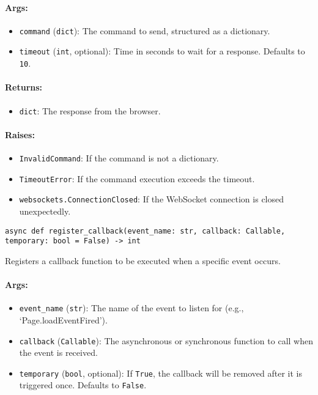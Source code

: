 \documentclass{article}
\begin{document}
\paragraph{Args:}
\begin{itemize}
    \item \texttt{command} (\texttt{dict}): The command to send, structured as a dictionary.
    \item \texttt{timeout} (\texttt{int}, optional): Time in seconds to wait for a response. Defaults to \texttt{10}.
\end{itemize}

\paragraph{Returns:}
\begin{itemize}
    \item \texttt{dict}: The response from the browser.
\end{itemize}

\paragraph{Raises:}
\begin{itemize}
    \item \texttt{InvalidCommand}: If the command is not a dictionary.
    \item \texttt{TimeoutError}: If the command execution exceeds the timeout.
    \item \texttt{websockets.ConnectionClosed}: If the WebSocket connection is closed unexpectedly.
\end{itemize}

\noindent\texttt{async def register\_callback(event\_name: str, callback: Callable, temporary: bool = False) -> int}

\noindent Registers a callback function to be executed when a specific event occurs.

\paragraph{Args:}
\begin{itemize}
    \item \texttt{event\_name} (\texttt{str}): The name of the event to listen for (e.g., `Page.loadEventFired').
    \item \texttt{callback} (\texttt{Callable}): The asynchronous or synchronous function to call when the event is received.
    \item \texttt{temporary} (\texttt{bool}, optional): If \texttt{True}, the callback will be removed after it is triggered once. Defaults to \texttt{False}.
\end{itemize}
\end{document}
